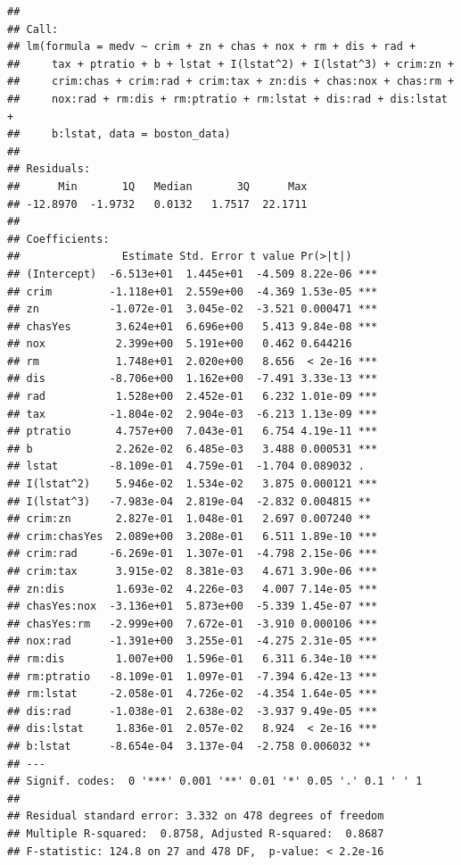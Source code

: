\documentclass[
]{article}
\begin{document}
\begin{verbatim}
## 
## Call:
## lm(formula = medv ~ crim + zn + chas + nox + rm + dis + rad + 
##     tax + ptratio + b + lstat + I(lstat^2) + I(lstat^3) + crim:zn + 
##     crim:chas + crim:rad + crim:tax + zn:dis + chas:nox + chas:rm + 
##     nox:rad + rm:dis + rm:ptratio + rm:lstat + dis:rad + dis:lstat + 
##     b:lstat, data = boston_data)
## 
## Residuals:
##      Min       1Q   Median       3Q      Max 
## -12.8970  -1.9732   0.0132   1.7517  22.1711 
## 
## Coefficients:
##                Estimate Std. Error t value Pr(>|t|)    
## (Intercept)  -6.513e+01  1.445e+01  -4.509 8.22e-06 ***
## crim         -1.118e+01  2.559e+00  -4.369 1.53e-05 ***
## zn           -1.072e-01  3.045e-02  -3.521 0.000471 ***
## chasYes       3.624e+01  6.696e+00   5.413 9.84e-08 ***
## nox           2.399e+00  5.191e+00   0.462 0.644216    
## rm            1.748e+01  2.020e+00   8.656  < 2e-16 ***
## dis          -8.706e+00  1.162e+00  -7.491 3.33e-13 ***
## rad           1.528e+00  2.452e-01   6.232 1.01e-09 ***
## tax          -1.804e-02  2.904e-03  -6.213 1.13e-09 ***
## ptratio       4.757e+00  7.043e-01   6.754 4.19e-11 ***
## b             2.262e-02  6.485e-03   3.488 0.000531 ***
## lstat        -8.109e-01  4.759e-01  -1.704 0.089032 .  
## I(lstat^2)    5.946e-02  1.534e-02   3.875 0.000121 ***
## I(lstat^3)   -7.983e-04  2.819e-04  -2.832 0.004815 ** 
## crim:zn       2.827e-01  1.048e-01   2.697 0.007240 ** 
## crim:chasYes  2.089e+00  3.208e-01   6.511 1.89e-10 ***
## crim:rad     -6.269e-01  1.307e-01  -4.798 2.15e-06 ***
## crim:tax      3.915e-02  8.381e-03   4.671 3.90e-06 ***
## zn:dis        1.693e-02  4.226e-03   4.007 7.14e-05 ***
## chasYes:nox  -3.136e+01  5.873e+00  -5.339 1.45e-07 ***
## chasYes:rm   -2.999e+00  7.672e-01  -3.910 0.000106 ***
## nox:rad      -1.391e+00  3.255e-01  -4.275 2.31e-05 ***
## rm:dis        1.007e+00  1.596e-01   6.311 6.34e-10 ***
## rm:ptratio   -8.109e-01  1.097e-01  -7.394 6.42e-13 ***
## rm:lstat     -2.058e-01  4.726e-02  -4.354 1.64e-05 ***
## dis:rad      -1.038e-01  2.638e-02  -3.937 9.49e-05 ***
## dis:lstat     1.836e-01  2.057e-02   8.924  < 2e-16 ***
## b:lstat      -8.654e-04  3.137e-04  -2.758 0.006032 ** 
## ---
## Signif. codes:  0 '***' 0.001 '**' 0.01 '*' 0.05 '.' 0.1 ' ' 1
## 
## Residual standard error: 3.332 on 478 degrees of freedom
## Multiple R-squared:  0.8758, Adjusted R-squared:  0.8687 
## F-statistic: 124.8 on 27 and 478 DF,  p-value: < 2.2e-16
\end{verbatim}
\end{document}
